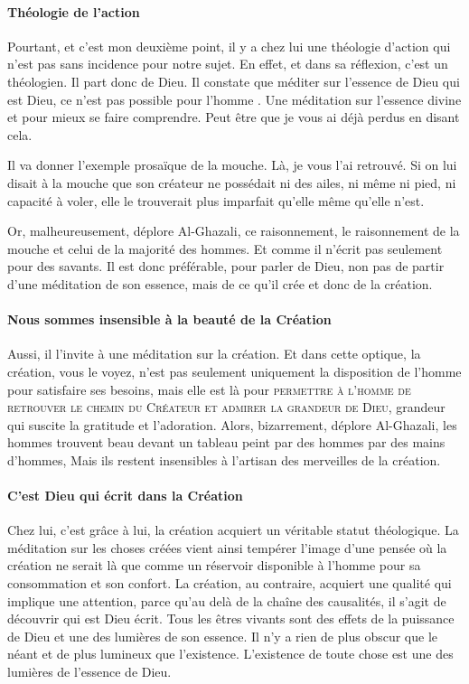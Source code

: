 \paragraph{Théologie de l'action}

  Pourtant, et c'est mon deuxième point, il y a chez lui une théologie d'action qui n'est pas sans incidence pour notre sujet. En effet, et dans sa réflexion, c'est un théologien.
Il part donc de Dieu. Il constate que méditer sur l'essence de Dieu qui est Dieu, ce n'est pas possible pour l'homme . Une méditation sur l'essence divine et pour mieux se faire comprendre. Peut être que je vous ai déjà perdus en disant cela. 
\begin{Ex}
Il va donner l'exemple prosaïque de la mouche. Là, je vous l'ai retrouvé.
Si on lui disait à la mouche que son créateur  ne possédait ni des ailes, ni même ni pied, ni capacité à voler, elle le trouverait plus imparfait qu'elle même qu'elle n'est. 
\end{Ex}
Or, malheureusement, déplore Al-Ghazali, ce raisonnement, le raisonnement de la mouche et celui de la majorité des hommes. Et comme il n'écrit pas seulement pour des savants. Il est donc préférable, pour parler de Dieu, non pas de partir d'une méditation de son essence, mais de ce qu'il crée et donc de la création.
\paragraph{Nous sommes insensible à la beauté de la Création}
Aussi, il l'invite à une méditation sur la création. Et dans cette optique, la création, vous le voyez, n'est pas seulement uniquement la disposition de l'homme pour satisfaire ses besoins, mais elle est là pour \textsc{permettre à l'homme de retrouver le chemin du Créateur et admirer la grandeur de Dieu}, grandeur qui suscite la gratitude et l'adoration. Alors, bizarrement, déplore Al-Ghazali, les hommes trouvent beau devant un tableau peint par des hommes par des mains d'hommes, Mais ils restent insensibles à l'artisan des merveilles de la création.
\paragraph{C'est Dieu qui écrit dans la Création}
Chez lui, c'est grâce à lui, la création acquiert un véritable statut théologique. La méditation sur les choses créées vient ainsi tempérer l'image d'une pensée où la création ne serait là que comme un réservoir disponible à l'homme pour sa consommation et son confort. La création, au contraire, acquiert une qualité qui implique une attention, parce qu'au delà de la chaîne des causalités, il s'agit de découvrir qui est Dieu écrit.
Tous les êtres vivants sont des effets de la puissance de Dieu et une des lumières de son essence. Il n'y a rien de plus obscur que le néant et de plus lumineux que l'existence. L'existence de toute chose est une des lumières de l'essence de Dieu. 
